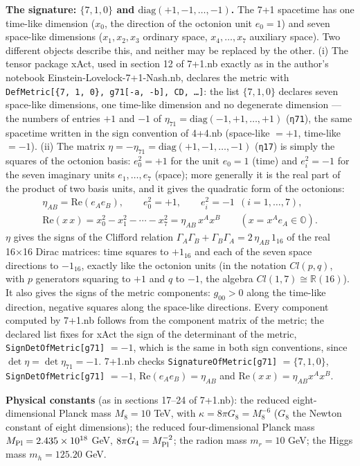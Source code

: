 \documentclass[10pt,a4paper]{article}
\begin{document}
\textbf{The signature: $\{7,1,0\}$ and $\mathrm{diag}(+1,-1,\dots,-1)$.} The 7+1 spacetime has one time-like dimension ($x_0$, the direction of the octonion unit $e_0=1$) and seven space-like dimensions ($x_1,x_2,x_3$ ordinary space, $x_4,\dots,x_7$ auxiliary space). Two different objects describe this, and neither may be replaced by the other. (i) The tensor package xAct, used in section 12 of 7+1.nb exactly as in the author’s notebook Einstein-Lovelock-7+1-Nash.nb, declares the metric with \texttt{DefMetric[\{7, 1, 0\}, g71[-a, -b], CD, …]}: the list $\{7,1,0\}$ declares seven space-like dimensions, one time-like dimension and no degenerate dimension — the numbers of entries $+1$ and $-1$ of $\eta_{71}=\mathrm{diag}(-1,+1,\dots,+1)$ (\texttt{η71}), the same spacetime written in the sign convention of 4+4.nb (space-like $=+1$, time-like $=-1$). (ii) The matrix $\eta=-\eta_{71}=\mathrm{diag}(+1,-1,\dots,-1)$ (\texttt{η17}) is simply the squares of the octonion basis: $e_0^2=+1$ for the unit $e_0=1$ (time) and $e_i^2=-1$ for the seven imaginary units $e_1,\dots,e_7$ (space); more generally it is the real part of the product of two basis units, and it gives the quadratic form of the octonions:
\begin{gather*}
\eta_{AB}=\mathrm{Re}(e_Ae_B),\qquad e_0^2=+1,\qquad e_i^2=-1\ \ (i=1,\dots,7),\\ \mathrm{Re}(x\,x)=x_0^2-x_1^2-\cdots-x_7^2=\eta_{AB}\,x^Ax^B\qquad (x=x^Ae_A\in\mathbb O).
\end{gather*}
$\eta$ gives the signs of the Clifford relation $\Gamma_A\Gamma_B+\Gamma_B\Gamma_A=2\,\eta_{AB}\,1_{16}$ of the real 16×16 Dirac matrices: time squares to $+1_{16}$ and each of the seven space directions to $-1_{16}$, exactly like the octonion units (in the notation $Cl(p,q)$, with $p$ generators squaring to $+1$ and $q$ to $-1$, the algebra $Cl(1,7)\cong\mathbb R(16)$). It also gives the signs of the metric components: $g_{00}>0$ along the time-like direction, negative squares along the space-like directions. Every component computed by 7+1.nb follows from the component matrix of the metric; the declared list fixes for xAct the sign of the determinant of the metric, \texttt{SignDetOfMetric[g71]} $=-1$, which is the same in both sign conventions, since $\det \eta=\det \eta_{71}=-1$. 7+1.nb checks \texttt{SignatureOfMetric[g71]} $=\{7,1,0\}$, \texttt{SignDetOfMetric[g71]} $=-1$, $\mathrm{Re}(e_Ae_B)=\eta_{AB}$ and $\mathrm{Re}(x\,x)=\eta_{AB}x^Ax^B$.

\textbf{Physical constants} (as in sections 17–24 of 7+1.nb): the reduced eight-dimensional Planck mass $M_8=10$ TeV, with $\kappa=8\pi G_8=M_8^{-6}$ ($G_8$ the Newton constant of eight dimensions); the reduced four-dimensional Planck mass $M_{\rm Pl}=2.435\times10^{18}$ GeV, $8\pi G_4=M_{\rm Pl}^{-2}$; the radion mass $m_r=10$ GeV; the Higgs mass $m_h=125.20$ GeV.
\end{document}
